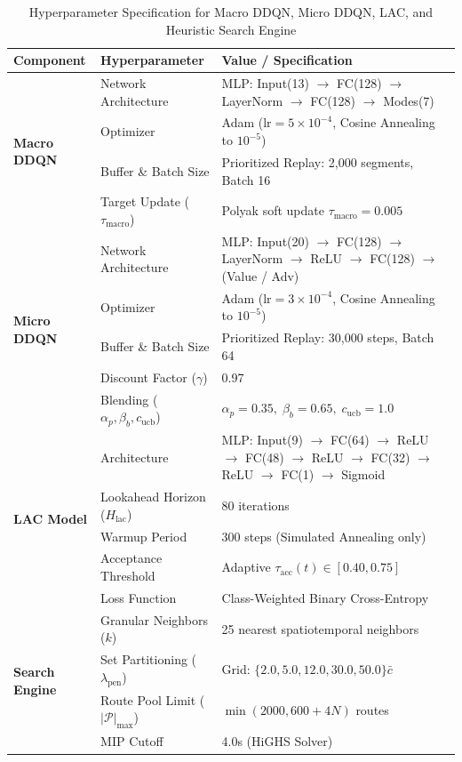 \documentclass{ieeeaccess}
\begin{document}
\begin{table}[!t]
\caption{Hyperparameter Specification for Macro DDQN, Micro DDQN, LAC, and Heuristic Search Engine}
\label{tab:hyperparameters}
\centering
\footnotesize
\begin{tabularx}{\columnwidth}{l l X}
\toprule
\textbf{Component} & \textbf{Hyperparameter} & \textbf{Value / Specification} \\
\midrule
\multirow{4}{*}{\textbf{Macro DDQN}} 
  & Network Architecture & MLP: Input(13) $\to$ FC(128) $\to$ LayerNorm $\to$ FC(128) $\to$ Modes(7) \\
  & Optimizer & Adam ($\text{lr} = 5 \times 10^{-4}$, Cosine Annealing to $10^{-5}$) \\
  & Buffer \& Batch Size & Prioritized Replay: 2,000 segments, Batch 16 \\
  & Target Update ($\tau_{\text{macro}}$) & Polyak soft update $\tau_{\text{macro}} = 0.005$ \\
\midrule
\multirow{5}{*}{\textbf{Micro DDQN}} 
  & Network Architecture & MLP: Input(20) $\to$ FC(128) $\to$ LayerNorm $\to$ ReLU $\to$ FC(128) $\to$ (Value / Adv) \\
  & Optimizer & Adam ($\text{lr} = 3 \times 10^{-4}$, Cosine Annealing to $10^{-5}$) \\
  & Buffer \& Batch Size & Prioritized Replay: 30,000 steps, Batch 64 \\
  & Discount Factor ($\gamma$) & 0.97 \\
  & Blending ($\alpha_p, \beta_b, c_{\text{ucb}}$) & $\alpha_p = 0.35, \; \beta_b = 0.65, \; c_{\text{ucb}} = 1.0$ \\
\midrule
\multirow{5}{*}{\textbf{LAC Model}} 
  & Architecture & MLP: Input(9) $\to$ FC(64) $\to$ ReLU $\to$ FC(48) $\to$ ReLU $\to$ FC(32) $\to$ ReLU $\to$ FC(1) $\to$ Sigmoid \\
  & Lookahead Horizon ($H_{\text{lac}}$) & 80 iterations \\
  & Warmup Period & 300 steps (Simulated Annealing only) \\
  & Acceptance Threshold & Adaptive $\tau_{\text{acc}}(t) \in [0.40, 0.75]$ \\
  & Loss Function & Class-Weighted Binary Cross-Entropy \\
\midrule
\multirow{4}{*}{\textbf{Search Engine}} 
  & Granular Neighbors ($k$) & 25 nearest spatiotemporal neighbors \\
  & Set Partitioning ($\lambda_{\text{pen}}$) & Grid: $\{2.0, 5.0, 12.0, 30.0, 50.0\}\bar{c}$ \\
  & Route Pool Limit ($|\mathcal{P}|_{\max}$) & $\min(2000, 600 + 4N)$ routes \\
  & MIP Cutoff & 4.0s (HiGHS Solver) \\
\bottomrule
\end{tabularx}
\end{table}
\end{document}
